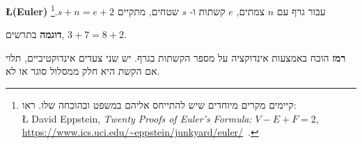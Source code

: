 \begin{center}
\end{center}

\begin{exercise} \textbf{\L{(Euler)}}
עבור גרף עם
$n$
צמתים,
$e$
קשתות ו-%
$s$
שטחים, מתקיים 
$s+n=e+2$.\footnote{%
קיימים מקרים מיוחדים שיש להתייחס אליהם במשפט ובהוכחה שלו. ראו:\\
\L{
David Eppstein, \textit{Twenty Proofs of Euler's Formula:} $V-E+F=2$,\\
\url{https://www.ics.uci.edu/~eppstein/junkyard/euler/}\ .}}
\end{exercise}
\textbf{דוגמה}
בתרשים, 
$3+7=8+2$.

\textbf{רמז}
הוכח באמצעות אינדוקציה על מספר הקשתות בגרף. יש שני צעדים אינדוקטיביים, תלוי אם הקשת היא חלק ממסלול סוגר או לא.

